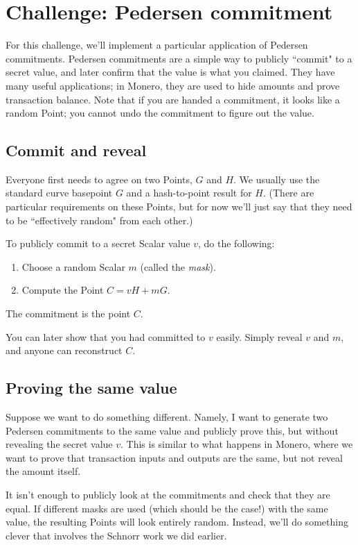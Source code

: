 \documentclass{article}
\begin{document}
\section{Challenge: Pedersen commitment}
For this challenge, we'll implement a particular application of Pedersen commitments. Pedersen commitments are a simple way to publicly ``commit" to a secret value, and later confirm that the value is what you claimed. They have many useful applications; in Monero, they are used to hide amounts and prove transaction balance. Note that if you are handed a commitment, it looks like a random Point; you cannot undo the commitment to figure out the value.

\subsection{Commit and reveal}
Everyone first needs to agree on two Points, $G$ and $H$. We usually use the standard curve basepoint $G$ and a hash-to-point result for $H$. (There are particular requirements on these Points, but for now we'll just say that they need to be ``effectively random" from each other.)

To publicly commit to a secret Scalar value $v$, do the following:
\begin{enumerate}
\item Choose a random Scalar $m$ (called the \textit{mask}).
\item Compute the Point $C = vH + mG$.
\end{enumerate}
The commitment is the point $C$.

You can later show that you had committed to $v$ easily. Simply reveal $v$ and $m$, and anyone can reconstruct $C$.

\subsection{Proving the same value}
Suppose we want to do something different. Namely, I want to generate two Pedersen commitments to the same value and publicly prove this, but without revealing the secret value $v$. This is similar to what happens in Monero, where we want to prove that transaction inputs and outputs are the same, but not reveal the amount itself.

It isn't enough to publicly look at the commitments and check that they are equal. If different masks are used (which should be the case!) with the same value, the resulting Points will look entirely random. Instead, we'll do something clever that involves the Schnorr work we did earlier.
\end{document}
